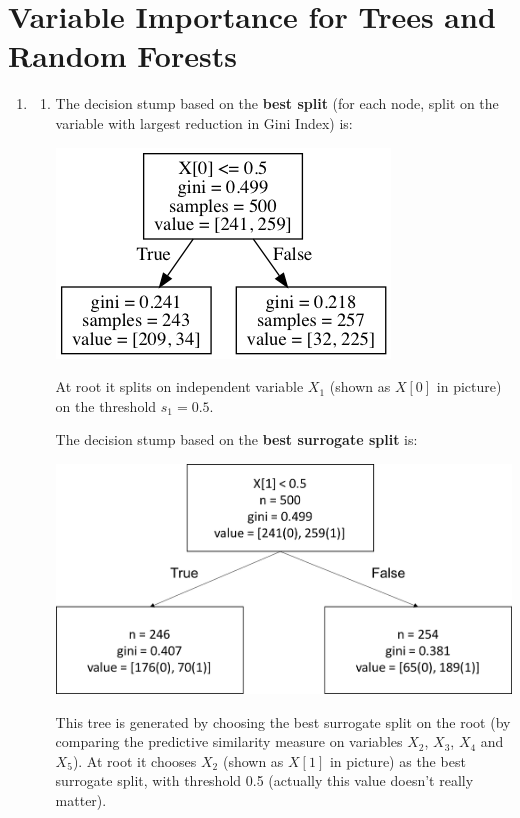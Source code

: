 \documentclass[paper=letter, fontsize=12pt]{article}
\begin{document}
\section{Variable Importance for Trees and Random Forests}

\begin{enumerate}[label=(\alph*)]
	\item 
	\begin{enumerate}[label=(\roman*)]
		\item 
		The decision stump based on the \textbf{best split} (for each node, split on the variable with largest reduction in Gini Index) is:
		
		\includegraphics[scale=0.6]{tree_best_split.png}
		
		At root it splits on independent variable $X_1$ (shown as $X[0]$ in picture) on the threshold $s_1 = 0.5$.
		
		The decision stump based on the \textbf{best surrogate split} is:
		
		\includegraphics[scale=0.4]{tree_best_surrogate_split.png}
		
		This tree is generated by choosing the best surrogate split on the root (by comparing the predictive similarity measure on variables $X_2$, $X_3$, $X_4$ and $X_5$). At root it chooses $X_2$ (shown as $X[1]$ in picture) as the best surrogate split, with threshold 0.5 (actually this value doesn't really matter).
		

\end{enumerate}
\end{enumerate}
\end{document}
